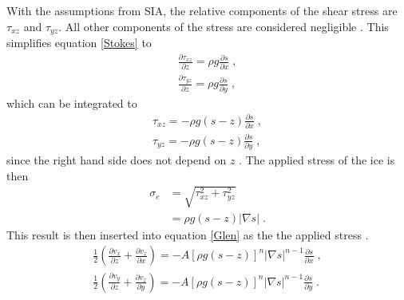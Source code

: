 \documentclass{article}
\begin{document}
With the assumptions from SIA, the relative components of the shear stress are $\tau_{xz}$ and $\tau_{yz}$. All other components of the stress are considered negligible \citep{Greve2009}. This simplifies equation \ref{Stokes} to 
\begin{subequations}\label{horSIA}
\begin{gather}
    \frac{\partial \tau_{xz}}{\partial z} = \rho g \frac{\partial s}{\partial x} \; , \\
    \frac{\partial \tau_{yz}}{\partial z} = \rho g \frac{\partial s}{\partial y} \; ,
\end{gather}
\end{subequations}
which can be integrated to
\begin{subequations}\label{horSIAint}
\begin{gather}
    \tau_{xz} = -\rho g(s-z) \frac{\partial s}{\partial x} \; ,\\
    \tau_{yz} = -\rho g(s-z) \frac{\partial s}{\partial y} \; ,
\end{gather}
\end{subequations}
since the right hand side does not depend on $z$ \citep{Greve2009}. The applied stress of the ice is then
\begin{align}
    \sigma_e &= \sqrt{\tau^2_{xz}+\tau^2_{yz}} \nonumber\\
     &= \rho g(s-z) |\nabla s| \; .
\end{align}
This result is then inserted into equation \ref{Glen} as the the applied stress \citep{Greve2009}. 
\begin{subequations}

\begin{gather}
   \frac{1}{2} \left(\frac{\partial v_x}{\partial z}+\frac{\partial v_z}{\partial x}\right) = -A[\rho g (s-z)]^n|\nabla s |^{n-1}\frac{\partial s}{\partial x} \; ,\\
    \frac{1}{2} \left(\frac{\partial v_y}{\partial z}+\frac{\partial v_z}{\partial y}\right)  = -A[\rho g (s-z)]^n|\nabla s |^{n-1}\frac{\partial s}{\partial y} \; .
\end{gather}
\end{subequations}
\end{document}
